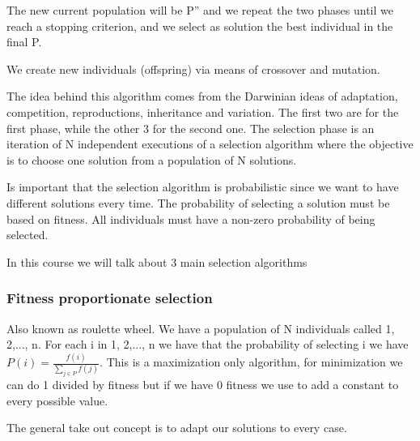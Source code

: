 The new current population will be P'' and we repeat the two phases until we reach a stopping criterion, and we select as solution the best individual in the final P. 

We create new individuals (offspring) via means of crossover and mutation.

\vspace{10pt}

The idea behind this algorithm comes from the Darwinian ideas of adaptation, competition, reproductions, inheritance and variation. The first two are for the first phase, while the other 3 for the second one. The selection phase is an iteration of N independent executions of a selection algorithm where the objective is to choose one solution from a population of N solutions. 

\vspace{10pt}

Is important that the selection algorithm is probabilistic since we want to have different solutions every time. The probability of selecting a solution must be based on fitness. All individuals must have a non-zero probability of being selected. 

\vspace{10pt}

In this course we will talk about 3 main selection algorithms

\subsubsection{Fitness proportionate selection}

Also known as roulette wheel. We have a population of N individuals called 1, 2,..., n. For each i in 1, 2,..., n we have that the probability of selecting i we have $P(i) = \frac{f(i)}{\sum_{j \in P} f(j)}$. This is a maximization only algorithm, for minimization we can do 1 divided by fitness but if we have 0 fitness we use to add a constant to every possible value. 

\vspace{10pt}

The general take out concept is to adapt our solutions to every case. 


